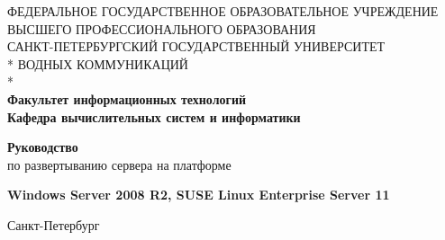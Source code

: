 {
\thispagestyle{empty}
\newpage

\begin{center}
ФЕДЕРАЛЬНОЕ ГОСУДАРСТВЕННОЕ ОБРАЗОВАТЕЛЬНОЕ УЧРЕЖДЕНИЕ ВЫСШЕГО ПРОФЕССИОНАЛЬНОГО ОБРАЗОВАНИЯ \\
\vspace{1cm}
САНКТ-ПЕТЕРБУРГСКИЙ ГОСУДАРСТВЕННЫЙ УНИВЕРСИТЕТ \\*
ВОДНЫХ КОММУНИКАЦИЙ \\*
\hrulefill\\
\textbf{Факультет информационных технологий \\
Кафедра вычислительных систем и информатики \\}
\end{center}

\vfill

\begin{center}
\textbf{Руководство}\\
\medskip
по развертыванию сервера на платформе\\
\medskip
\end{center}

\begin{center}
\textbf{Windows Server 2008 R2, SUSE Linux Enterprise Server 11}\\
\end{center}

\vfill
\vfill

\begin{center}
Санкт-Петербург \number\year
\end{center}
\clearpage

}